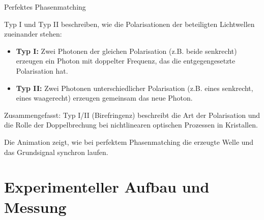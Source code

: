 \documentclass[aspectratio=169]{beamer} %
\begin{document}
\begin{frame}{Perfektes Phasenmatching}
{Typ I und Typ II beschreiben, wie die Polarisationen der beteiligten Lichtwellen zueinander stehen:
\begin{itemize}
  \item \textbf{Typ I:} Zwei Photonen der gleichen Polarisation (z.B. beide senkrecht) erzeugen ein Photon mit doppelter Frequenz, das die entgegengesetzte Polarisation hat.
  \item \textbf{Typ II:} Zwei Photonen unterschiedlicher Polarisation (z.B. eines senkrecht, eines waagerecht) erzeugen gemeinsam das neue Photon.
\end{itemize}
Zusammengefasst:
Typ I/II (Birefringenz) beschreibt die Art der Polarisation und die Rolle der Doppelbrechung bei nichtlinearen optischen Prozessen in Kristallen.

    Die Animation zeigt, wie bei perfektem Phasenmatching die erzeugte Welle und das Grundsignal synchron laufen.
  }
\end{frame}


\section{Experimenteller Aufbau und Messung}
\end{document}
